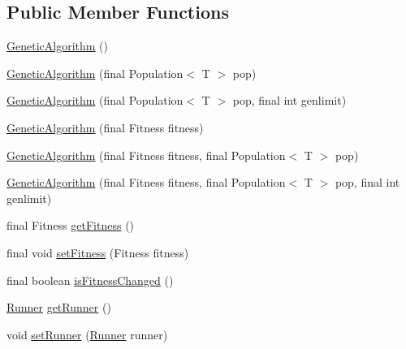 \subsection*{Public Member Functions}
\begin{DoxyCompactItemize}
\item 
\hyperlink{classjenes_1_1_genetic_algorithm_3_01_t_01extends_01_chromosome_01_4_acfda239e0d2154eb26a7be4f6aa1315d}{Genetic\-Algorithm} ()
\item 
\hyperlink{classjenes_1_1_genetic_algorithm_3_01_t_01extends_01_chromosome_01_4_aede3d2fbd3c3d1cf04a4e419649cae93}{Genetic\-Algorithm} (final Population$<$ T $>$ pop)
\item 
\hyperlink{classjenes_1_1_genetic_algorithm_3_01_t_01extends_01_chromosome_01_4_afe0501230c1645d2a6cdf54af2672639}{Genetic\-Algorithm} (final Population$<$ T $>$ pop, final int genlimit)
\item 
\hyperlink{classjenes_1_1_genetic_algorithm_3_01_t_01extends_01_chromosome_01_4_aefcf45276a730906c98ff8de90b6c48e}{Genetic\-Algorithm} (final Fitness fitness)
\item 
\hyperlink{classjenes_1_1_genetic_algorithm_3_01_t_01extends_01_chromosome_01_4_a08a57814b09412baed3146d2cc6e2174}{Genetic\-Algorithm} (final Fitness fitness, final Population$<$ T $>$ pop)
\item 
\hyperlink{classjenes_1_1_genetic_algorithm_3_01_t_01extends_01_chromosome_01_4_af3997e737162629c161c04a65dd830a0}{Genetic\-Algorithm} (final Fitness fitness, final Population$<$ T $>$ pop, final int genlimit)
\item 
final Fitness \hyperlink{classjenes_1_1_genetic_algorithm_3_01_t_01extends_01_chromosome_01_4_a687996ee45582145be24e2086fc8c210}{get\-Fitness} ()
\item 
final void \hyperlink{classjenes_1_1_genetic_algorithm_3_01_t_01extends_01_chromosome_01_4_aff762153c3f11a2ad83936867ca31617}{set\-Fitness} (Fitness fitness)
\item 
final boolean \hyperlink{classjenes_1_1_genetic_algorithm_3_01_t_01extends_01_chromosome_01_4_a7d5cb4716cbc586aa85774c5dc934d15}{is\-Fitness\-Changed} ()
\item 
\hyperlink{classjenes_1_1utils_1_1multitasking_1_1_runner}{Runner} \hyperlink{classjenes_1_1_genetic_algorithm_3_01_t_01extends_01_chromosome_01_4_a63ea13380fe4a30d1eabd394e44d6e96}{get\-Runner} ()
\item 
void \hyperlink{classjenes_1_1_genetic_algorithm_3_01_t_01extends_01_chromosome_01_4_a6ff8bcd8e9049106c7959637e4e10e70}{set\-Runner} (\hyperlink{classjenes_1_1utils_1_1multitasking_1_1_runner}{Runner} runner)

\end{DoxyCompactItemize}
